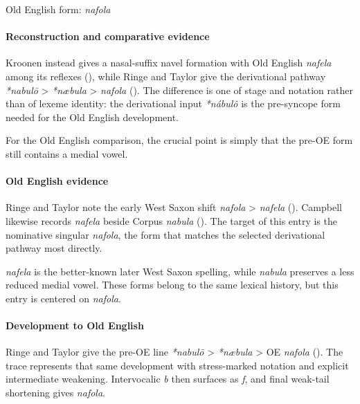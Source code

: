 \documentclass[
  british,
  a4paper,
]{article}
\begin{document}
Old English form: \emph{nafola}

\paragraph{Reconstruction and comparative
evidence}\label{reconstruction-and-comparative-evidence-19}

Kroonen instead gives a nasal-suffix navel formation with Old English
\emph{nafela} among its reflexes (), while Ringe and Taylor give the derivational pathway
\emph{*nabulō} \textgreater{} \emph{*næbula} \textgreater{}
\emph{nafola} (). The difference is one of stage and notation rather than of lexeme
identity: the derivational input \emph{*nábulô} is the pre-syncope form
needed for the Old English development.

For the Old English comparison, the crucial point is simply that the
pre-OE form still contains a medial vowel.

\paragraph{Old English evidence}\label{old-english-evidence-19}

Ringe and Taylor note the early West Saxon shift \emph{nafola}
\textgreater{} \emph{nafela} (). Campbell likewise records \emph{nafela} beside
Corpus \emph{nabula} (). The target of this entry is the nominative singular
\emph{nafola}, the form that matches the selected derivational pathway
most directly.

\emph{nafela} is the better-known later West Saxon spelling, while
\emph{nabula} preserves a less reduced medial vowel. These forms belong
to the same lexical history, but this entry is centered on
\emph{nafola}.

\paragraph{Development to Old
English}\label{development-to-old-english-19}

Ringe and Taylor give the pre-OE line \emph{*nabulō} \textgreater{}
\emph{*næbula} \textgreater{} OE \emph{nafola}
(). The trace
represents that same development with stress-marked notation and
explicit intermediate weakening. Intervocalic \emph{b} then surfaces as
\emph{f}, and final weak-tail shortening gives \emph{nafola}.
\end{document}
